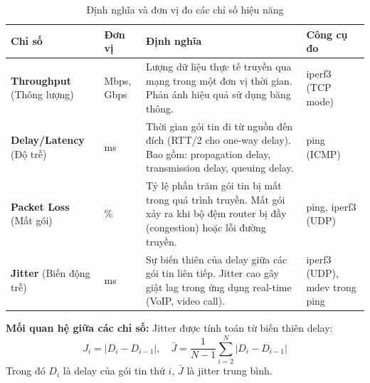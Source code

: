 \begin{table}[htbp]
    \centering
    \caption{Định nghĩa và đơn vị đo các chỉ số hiệu năng}
    \vspace{0.2cm}
    \begin{tabularx}{\textwidth}{|>{\raggedright\arraybackslash}p{3cm}|>{\raggedright\arraybackslash}p{2cm}|>{\raggedright\arraybackslash}X|>{\raggedright\arraybackslash}p{3cm}|}
        \hline
        \textbf{Chỉ số} & \textbf{Đơn vị} & \textbf{Định nghĩa} & \textbf{Công cụ đo} \\ \hline
        \textbf{Throughput} (Thông lượng) & Mbps, Gbps & Lượng dữ liệu thực tế truyền qua mạng trong một đơn vị thời gian. Phản ánh hiệu quả sử dụng băng thông. & iperf3 (TCP mode) \\ \hline
        \textbf{Delay/Latency} (Độ trễ) & ms & Thời gian gói tin đi từ nguồn đến đích (RTT/2 cho one-way delay). Bao gồm: propagation delay, transmission delay, queuing delay. & ping (ICMP) \\ \hline
        \textbf{Packet Loss} (Mất gói) & \% & Tỷ lệ phần trăm gói tin bị mất trong quá trình truyền. Mất gói xảy ra khi bộ đệm router bị đầy (congestion) hoặc lỗi đường truyền. & ping, iperf3 (UDP) \\ \hline
        \textbf{Jitter} (Biến động trễ) & ms & Sự biến thiên của delay giữa các gói tin liên tiếp. Jitter cao gây giật lag trong ứng dụng real-time (VoIP, video call). & iperf3 (UDP), mdev trong ping \\ \hline
    \end{tabularx}
\end{table}

\textbf{Mối quan hệ giữa các chỉ số:} Jitter được tính toán từ biến thiên delay:
\[
J_i = |D_{i} - D_{i-1}|, \quad \bar{J} = \frac{1}{N-1}\sum_{i=2}^{N}|D_i - D_{i-1}|
\]
Trong đó $D_i$ là delay của gói tin thứ $i$, $\bar{J}$ là jitter trung bình.
